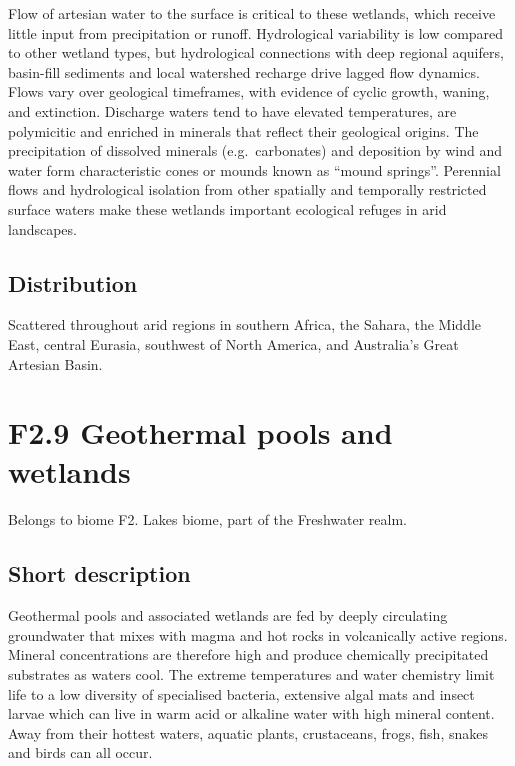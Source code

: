 \documentclass[
  letterpaper,
  DIV=11,
  numbers=noendperiod]{scrartcl}
\begin{document}
Flow of artesian water to the surface is critical to these wetlands,
which receive little input from precipitation or runoff. Hydrological
variability is low compared to other wetland types, but hydrological
connections with deep regional aquifers, basin-fill sediments and local
watershed recharge drive lagged flow dynamics. Flows vary over
geological timeframes, with evidence of cyclic growth, waning, and
extinction. Discharge waters tend to have elevated temperatures, are
polymicitic and enriched in minerals that reflect their geological
origins. The precipitation of dissolved minerals (e.g.~carbonates) and
deposition by wind and water form characteristic cones or mounds known
as ``mound springs''. Perennial flows and hydrological isolation from
other spatially and temporally restricted surface waters make these
wetlands important ecological refuges in arid landscapes.

\subsection{Distribution}\label{distribution-124}

Scattered throughout arid regions in southern Africa, the Sahara, the
Middle East, central Eurasia, southwest of North America, and
Australia's Great Artesian Basin.

\section{F2.9 Geothermal pools and
wetlands}\label{f2.9-geothermal-pools-and-wetlands-1}

Belongs to biome F2. Lakes biome, part of the Freshwater realm.

\subsection{Short description}\label{short-description-125}

Geothermal pools and associated wetlands are fed by deeply circulating
groundwater that mixes with magma and hot rocks in volcanically active
regions. Mineral concentrations are therefore high and produce
chemically precipitated substrates as waters cool. The extreme
temperatures and water chemistry limit life to a low diversity of
specialised bacteria, extensive algal mats and insect larvae which can
live in warm acid or alkaline water with high mineral content. Away from
their hottest waters, aquatic plants, crustaceans, frogs, fish, snakes
and birds can all occur.
\end{document}
